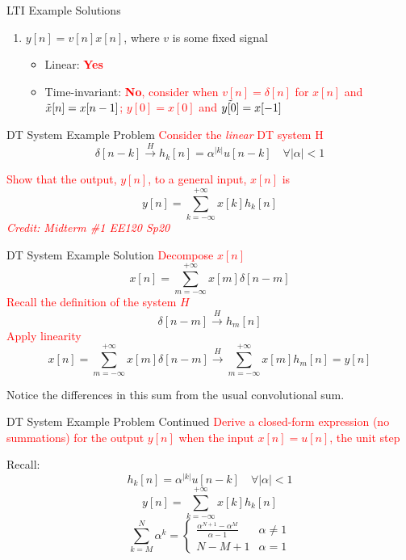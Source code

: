 \begin{frame}{LTI Example Solutions}
\begin{enumerate}
\begin{itemize}
        \end{itemize}
        \item $y[n] = v[n]x[n]$, where $v$ is some fixed signal
        \begin{itemize}
            \item Linear: \textcolor{red}{\textbf{Yes}}
            \item Time-invariant: \textcolor{red}{\textbf{No}, consider when $v[n] = \delta[n]$ for $x[n]$ and $\Tilde{x}[n] = x[n-1]$; $y[0] = x[0]$ and $\Tilde{y[0]} = x[-1]$}
        \end{itemize}
    \end{enumerate}
\end{frame}

\begin{frame}{DT System Example Problem}
    \textcolor{red}{Consider the \textit{linear} DT system H}
    \[
    \delta[n-k] \overset{H}{\longrightarrow} h_k[n] = \alpha^{|k|}u[n-k] \quad \forall |\alpha| < 1
    \]

    \vspace{30px}

    \textcolor{red}{Show that the output, $y[n]$, to a general input, $x[n]$ is}
    \[
        y[n] = \sum_{k=-\infty}^{+\infty}x[k]h_k[n]
    \]
    {\footnotesize\textcolor{red}{\textit{Credit: Midterm \#1 EE120 Sp20}}}

\end{frame}

\begin{frame}{DT System Example Solution}
    \textcolor{red}{Decompose $x[n]$}
    \[x[n] = \sum_{m=-\infty}^{+\infty}x[m]\delta[n-m]\]
    \textcolor{red}{Recall the definition of the system $H$}
    \[\delta[n-m] \overset{H}{\longrightarrow} h_m[n]\]
    \textcolor{red}{Apply linearity}
    \[x[n] = \sum_{m=-\infty}^{+\infty}x[m]\delta[n-m] \overset{H}{\longrightarrow} \sum_{m=-\infty}^{+\infty}x[m]h_m[n] = y[n]\]

    Notice the differences in this sum from the usual convolutional sum.
\end{frame}

\begin{frame}{DT System Example Problem Continued}
    \textcolor{red}{Derive a closed-form expression (no summations) for the output $y[n]$ when the input $x[n] = u[n]$, the unit step}

    Recall:
    \[h_k[n] = \alpha^{|k|}u[n-k] \quad \forall |\alpha| < 1\]
    \[y[n] = \sum_{k=-\infty}^{+\infty}x[k]h_k[n]\]
    \[\sum_{k=M}^N \alpha^k =
        \begin{cases}
            \frac{\alpha^{N+1}-\alpha^M}{\alpha-1} & \alpha\ne 1 \\
            N-M+1 & \alpha= 1
        \end{cases}
    \]
\end{frame}

